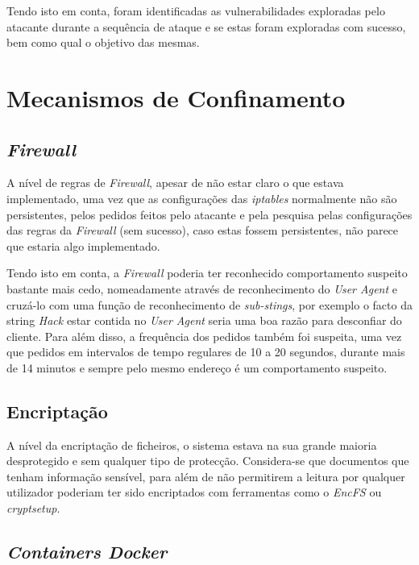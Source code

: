 \documentclass[10pt,english]{article}
\begin{document}
\par Tendo isto em conta, foram identificadas as vulnerabilidades exploradas pelo atacante durante a sequência de ataque e se estas foram exploradas com sucesso, bem como qual o objetivo das mesmas. 
\clearpage

\clearpage

\section{Mecanismos de Confinamento}

\subsection{\textit{Firewall}}
\par A nível de regras de \textit{Firewall}, apesar de não estar claro o que estava implementado, uma vez que as configurações das \textit{iptables} normalmente não são persistentes, pelos pedidos feitos pelo atacante e pela pesquisa pelas configurações das regras da \textit{Firewall} (sem sucesso), caso estas fossem persistentes, não parece que estaria algo implementado.

\par Tendo isto em conta, a \textit{Firewall} poderia ter reconhecido comportamento suspeito bastante mais cedo, nomeadamente através de reconhecimento do \textit{User Agent} e cruzá-lo com uma função de reconhecimento de \textit{sub-stings}, por exemplo o facto da string \textit{Hack} estar contida no \textit{User Agent} seria uma boa razão para desconfiar do cliente. Para além disso, a frequência dos pedidos também foi suspeita, uma vez que pedidos em intervalos de tempo regulares de 10 a 20 segundos, durante mais de 14 minutos e sempre pelo mesmo endereço é um comportamento suspeito.

\subsection{Encriptação}
\par A nível da encriptação de ficheiros, o sistema estava na sua grande maioria desprotegido e sem qualquer tipo de protecção. Considera-se que documentos que tenham informação sensível, para além de não permitirem a leitura por qualquer utilizador poderiam ter sido encriptados com ferramentas como o \textit{EncFS} ou \textit{cryptsetup}.

\subsection{\textit{Containers Docker}}
\end{document}
